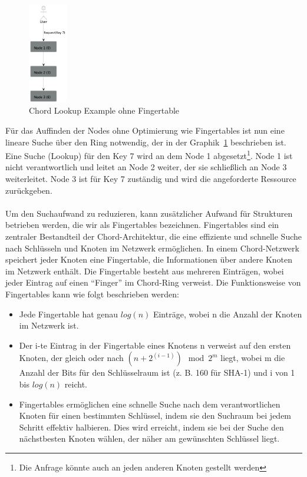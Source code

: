 \begin{figure}[!ht]
  \centering
  \includegraphics[width=0.15\textwidth]{fig/uml/chord.png}
  \caption{Chord Lookup Example ohne Fingertable}
  \label{fig:chord-lookup}
\end{figure}
Für das Auffinden der Nodes ohne Optimierung wie Fingertables ist nun eine lineare Suche über den Ring notwendig, der in der Graphik~\ref{fig:chord-lookup} beschrieben ist. Eine Suche (Lookup) für den Key 7 wird an dem Node 1 abgesetzt\footnote{Die Anfrage könnte auch an jeden anderen Knoten gestellt werden}. Node 1 ist nicht verantwortlich und leitet an Node 2 weiter, der sie schließlich an Node 3 weiterleitet. Node 3 ist für Key 7 zuständig und wird die angeforderte Ressource zurückgeben.
\\\\
Um den Suchaufwand zu reduzieren, kann zusätzlicher Aufwand für Strukturen betrieben werden, die wir als Fingertables bezeichnen. 
Fingertables sind ein zentraler Bestandteil der Chord-Architektur, die eine effiziente und schnelle Suche nach Schlüsseln und Knoten im Netzwerk ermöglichen. In einem Chord-Netzwerk speichert jeder Knoten eine Fingertable, die Informationen über andere Knoten im Netzwerk enthält. Die Fingertable besteht aus mehreren Einträgen, wobei jeder Eintrag auf einen \enquote{Finger} im Chord-Ring verweist. Die Funktionsweise von Fingertables kann wie folgt beschrieben werden:
\begin{itemize} 
\item Jede Fingertable hat genau $log(n)$ Einträge, wobei n die Anzahl der Knoten im Netzwerk ist.
\item Der i-te Eintrag in der Fingertable eines Knotens n verweist auf den ersten Knoten, der gleich oder nach $(n + 2^{(i-1)}) \mod 2^m$ liegt, wobei m die Anzahl der Bits für den Schlüsselraum ist (z. B. 160 für SHA-1) und i von 1 bis $log(n)$ reicht.
\item Fingertables ermöglichen eine schnelle Suche nach dem verantwortlichen Knoten für einen bestimmten Schlüssel, indem sie den Suchraum bei jedem Schritt effektiv halbieren. Dies wird erreicht, indem sie bei der Suche den nächstbesten Knoten wählen, der näher am gewünschten Schlüssel liegt.
\end{itemize} 

